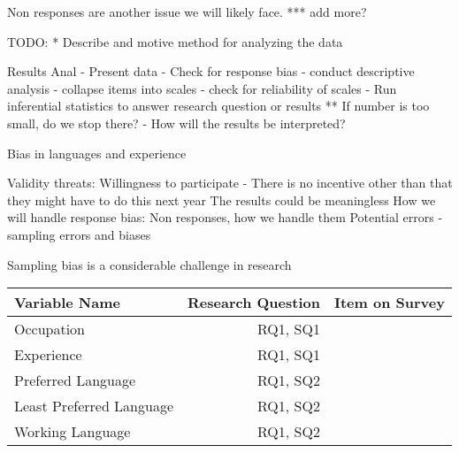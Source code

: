 \documentclass[times, 10pt,twocolumn]{IEEEtran}
\begin{document}
Non responses are another issue we will likely face. *** add more?


TODO:
* Describe  and motive  method  for analyzing the data

Results Anal
- Present data 
- Check for response bias
- conduct descriptive analysis
- collapse items into scales
- check for reliability of scales
- Run inferential statistics to answer research question or results
** If number is too small, do we stop there?
- How will the results be interpreted?


Bias in languages and experience

  Validity threats:
    Willingness to participate - There is no incentive other than that they might have to do this next year
    The results could be meaningless
    How we will handle response bias:
      Non responses, how we handle them
  Potential errors - sampling errors and biases

  Sampling bias is a considerable challenge in research \cite{easterbrook2008selecting}





\begin{tabular}{| l | r | c |}
	\hline
	\textbf{Variable Name} & \textbf{Research Question} & \textbf{Item on Survey} \\ \hline
	Occupation & RQ1, SQ1 & \\ \hline
	Experience & RQ1, SQ1 & \\ \hline
	Preferred Language & RQ1, SQ2 & \\ \hline
	Least Preferred Language & RQ1, SQ2& \\  \hline
	Working Language & RQ1, SQ2 & \\ 
	\hline
	\end{tabular}
\end{document}
